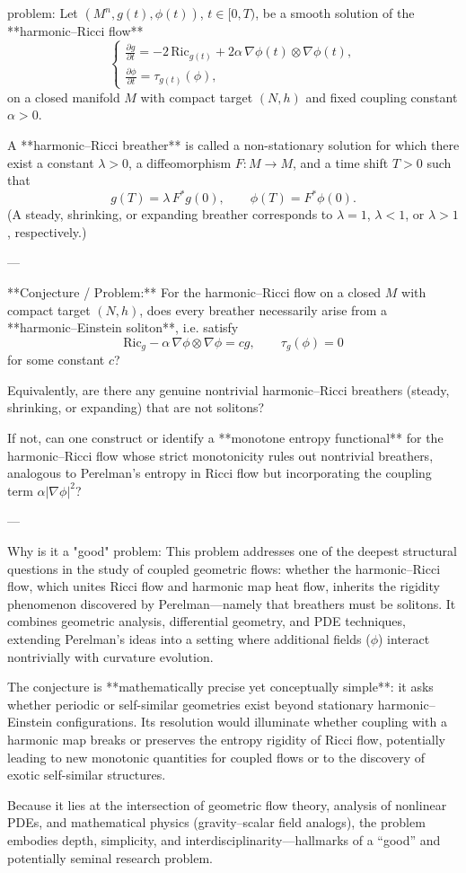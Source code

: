 problem:  
Let \((M^n,g(t),\phi(t))\), \(t\in[0,T)\), be a smooth solution of the **harmonic–Ricci flow**  
\[
\begin{cases}
\frac{\partial g}{\partial t} = -2\,\mathrm{Ric}_{g(t)} + 2\alpha\,\nabla \phi(t)\otimes \nabla \phi(t),\\[3pt]
\frac{\partial \phi}{\partial t} = \tau_{g(t)}(\phi),
\end{cases}
\]
on a closed manifold \(M\) with compact target \((N,h)\) and fixed coupling constant \(\alpha>0\).  

A **harmonic–Ricci breather** is called a non-stationary solution for which there exist a constant \(\lambda>0\), a diffeomorphism \(F:M\to M\), and a time shift \(T>0\) such that  
\[
g(T) = \lambda\,F^*g(0), \qquad \phi(T) = F^*\phi(0).
\]
(A steady, shrinking, or expanding breather corresponds to \(\lambda=1\), \(\lambda<1\), or \(\lambda>1\), respectively.)

---

**Conjecture / Problem:**  
For the harmonic–Ricci flow on a closed \(M\) with compact target \((N,h)\), does every breather necessarily arise from a **harmonic–Einstein soliton**, i.e. satisfy  
\[
\mathrm{Ric}_g - \alpha\,\nabla \phi\otimes\nabla \phi = c g,\qquad \tau_g(\phi)=0
\]
for some constant \(c\)? 

Equivalently, are there any genuine nontrivial harmonic–Ricci breathers (steady, shrinking, or expanding) that are not solitons?

If not, can one construct or identify a **monotone entropy functional** for the harmonic–Ricci flow whose strict monotonicity rules out nontrivial breathers, analogous to Perelman’s entropy in Ricci flow but incorporating the coupling term \(\alpha|\nabla \phi|^2\)?

---

Why is it a "good" problem:  
This problem addresses one of the deepest structural questions in the study of coupled geometric flows: whether the harmonic–Ricci flow, which unites Ricci flow and harmonic map heat flow, inherits the rigidity phenomenon discovered by Perelman—namely that breathers must be solitons. It combines geometric analysis, differential geometry, and PDE techniques, extending Perelman’s ideas into a setting where additional fields (\(\phi\)) interact nontrivially with curvature evolution.

The conjecture is **mathematically precise yet conceptually simple**: it asks whether periodic or self-similar geometries exist beyond stationary harmonic–Einstein configurations. Its resolution would illuminate whether coupling with a harmonic map breaks or preserves the entropy rigidity of Ricci flow, potentially leading to new monotonic quantities for coupled flows or to the discovery of exotic self-similar structures.  

Because it lies at the intersection of geometric flow theory, analysis of nonlinear PDEs, and mathematical physics (gravity–scalar field analogs), the problem embodies depth, simplicity, and interdisciplinarity—hallmarks of a “good” and potentially seminal research problem.